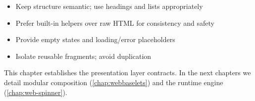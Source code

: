\begin{itemize}
  \item Keep structure semantic; use headings and lists appropriately
  \item Prefer built-in helpers over raw HTML for consistency and safety
  \item Provide empty states and loading/error placeholders
  \item Isolate reusable fragments; avoid duplication
\end{itemize}

This chapter establishes the presentation layer contracts. In the next chapters we detail modular composition (\cref{chap:webbaselets}) and the runtime engine (\cref{chap:web-spinner}).
